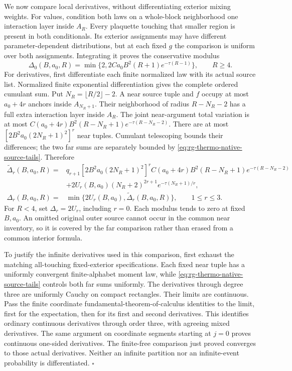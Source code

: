 We now compare local derivatives, without differentiating exterior mixing
weights. For values, condition both laws on a whole-block neighborhood
one interaction layer inside \(A_R\). Every plaquette touching that
smaller region is present in both conditionals. Its exterior assignments
may have different parameter-dependent distributions, but at each fixed
\(g\) the comparison is uniform over both assignments. Integrating it
proves the conservative modulus
\begin{equation}
 \Delta_0(B,a_0,R)=\min\{2,2Ca_0B^2(R+1)e^{-\tau(R-1)}\},
 \qquad R\ge4.
 \label{eq:rg-thermo-native-value-modulus}
\end{equation}
For derivatives, first differentiate each finite normalized law with its
actual source list. Normalized finite exponential differentiation gives
the complete ordered cumulant sum. Put
\(N_R=\lfloor R/2\rfloor-2\). A near source tuple and \(f\) occupy at
most \(a_0+4r\) anchors inside \(A_{N_R+1}\). Their neighborhood of
radius \(R-N_R-2\) has a full extra interaction layer inside \(A_R\).
The joint near-argument total variation is at most
\(C(a_0+4r)B^2(R-N_R+1)e^{-\tau(R-N_R-2)}\).
There are at most \([2B^2a_0(2N_R+1)^2]^r\) near tuples.
Cumulant telescoping bounds their differences; the two far sums are
separately bounded by \cref{eq:rg-thermo-native-source-tails}. Therefore
\begin{equation}
 \begin{split}
 \widetilde\Delta_r(B,a_0,R)={}&
 q_{r+1}[2B^2a_0(2N_R+1)^2]^r
 C(a_0+4r)B^2(R-N_R+1)e^{-\tau(R-N_R-2)}\\
 &+2U_r(B,a_0)(N_R+2)^{2r+1}e^{-\tau(N_R+1)/r},\\
 \Delta_r(B,a_0,R)={}&
 \min\{2U_r(B,a_0),\widetilde\Delta_r(B,a_0,R)\},
 \qquad 1\le r\le3.
 \end{split}
 \label{eq:rg-thermo-native-derivative-moduli}
\end{equation}
For \(R<4\), set \(\Delta_r=2U_r\), including \(r=0\). Each
modulus tends to zero at fixed \(B,a_0\). An omitted original outer
source cannot occur in the common near inventory, so it is covered by the
far comparison rather than erased from a common interior formula.

To justify the infinite derivatives used in this comparison, first exhaust
the matching all-touching fixed-exterior specifications. Each fixed near
tuple has a uniformly convergent finite-alphabet moment law, while
\cref{eq:rg-thermo-native-source-tails} controls both far sums uniformly.
The derivatives through degree three are uniformly Cauchy on compact
rectangles. Their limits are continuous. Pass the finite coordinate
fundamental-theorem-of-calculus identities to the limit, first for the
expectation, then for its first and second derivatives. This identifies
ordinary continuous derivatives through order three, with agreeing mixed
derivatives. The same argument on coordinate segments starting at \(j=0\)
proves continuous one-sided derivatives. The finite-free comparison just
proved converges to those actual derivatives. Neither an infinite
partition nor an infinite-event probability is differentiated.
\hfill\(\square\)

